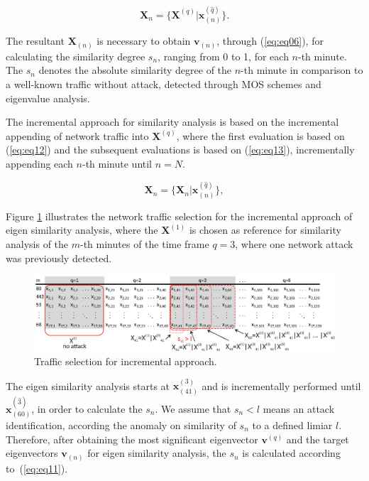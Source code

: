 \begin{equation}\label{eq:eq12}
\boldsymbol{X}_{n} = \{\boldsymbol{X}^{(q)} | \boldsymbol{x}^{(\hat{q})}_{(n)}\}.
\end{equation}

The resultant $\boldsymbol{X}_{(n)}$ is necessary to obtain $\boldsymbol{v}_{(n)}$, through (\ref{eq:eq06}), for calculating the similarity degree $s_n$, ranging from 0 to 1, for each $n$-th minute. The $s_n$ denotes the absolute similarity degree of the $n$-th minute in comparison to a well-known traffic without attack, detected through MOS schemes and eigenvalue analysis.

The incremental approach for similarity analysis is based on the incremental appending of network traffic into $\boldsymbol{X}^{(q)}$, where the first evaluation is based on (\ref{eq:eq12}) and the subsequent evaluations is based on (\ref{eq:eq13}), incrementally appending each $n$-th minute until $n=N$.

\begin{equation}\label{eq:eq13}
\boldsymbol{X}_{n} = \{\boldsymbol{X}_{n} | \boldsymbol{x}^{(\hat{q})}_{(n)}\},
\end{equation}

Figure \ref{fig:2_fig8} illustrates the network traffic selection for the incremental approach of eigen similarity analysis, where the $\boldsymbol{X}^{(1)}$ is chosen as reference for similarity analysis of the $m$-th minutes of the time frame $q=3$, where one network attack was previously detected. 

\begin{figure}[h!]
     \includegraphics[width=15cm]{figures/incremental.eps}
     \caption{Traffic selection for incremental approach.}
     \label{fig:2_fig8}
\end{figure}

The eigen similarity analysis starts at $\boldsymbol{x}^{(3)}_{(41)}$ and is incrementally performed until $\boldsymbol{x}^{(\hat{3})}_{(60)}$, in order to calculate the $s_n$. We assume that $s_n < l$ means an attack identification, according the anomaly on similarity of $s_n$ to a defined limiar $l$. Therefore, after obtaining the most significant eigenvector $\boldsymbol{v}^{(q)}$ and the target eigenvectors $\boldsymbol{v}_{(n)}$ for eigen similarity analysis, the $s_n$ is calculated according to~(\ref{eq:eq11}).

